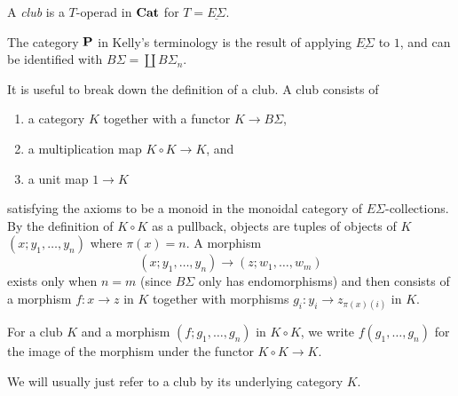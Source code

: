 \begin{Defi}
A \textit{club} is a $T$-operad in $\mathbf{Cat}$ for $T = \underline{E\Sigma}$.
\end{Defi}

\begin{rem}
The category $\mathbf{P}$ in Kelly's terminology is the result of applying $\underline{E\Sigma}$ to $1$, and can be identified with $B\Sigma = \coprod B\Sigma_{n}$.
\end{rem}

It is useful to break down the definition of a club. A club consists of
\begin{enumerate}
\item a category $K$ together with a functor $K \rightarrow B \Sigma$,
\item a multiplication map $K \circ K \rightarrow K$, and
\item a unit map $1 \rightarrow K$
\end{enumerate}
satisfying the axioms to be a monoid in the monoidal category of $E\Sigma$-collections. By the definition of $K \circ K$ as a pullback, objects are tuples of objects of $K$ $(x; y_{1}, \ldots, y_{n})$ where $\pi(x) = n$. A morphism
  \[
    (x; y_{1}, \ldots, y_{n}) \rightarrow (z; w_{1}, \ldots, w_{m})
  \]
exists only when $n=m$ (since $B\Sigma$ only has endomorphisms) and then consists of a morphism $f \colon x \rightarrow z$ in $K$ together with morphisms $g_{i} \colon y_{i} \rightarrow z_{\pi(x)(i)}$ in $K$.

\begin{nota}\label{nota:clubmult}
For a club $K$ and a morphism $(f; g_{1}, \ldots, g_{n})$ in $K \circ K$, we write $f(g_{1}, \ldots, g_{n})$ for the image of the morphism under the functor $K \circ K \rightarrow K$.
\end{nota}

We will usually just refer to a club by its underlying category $K$.


